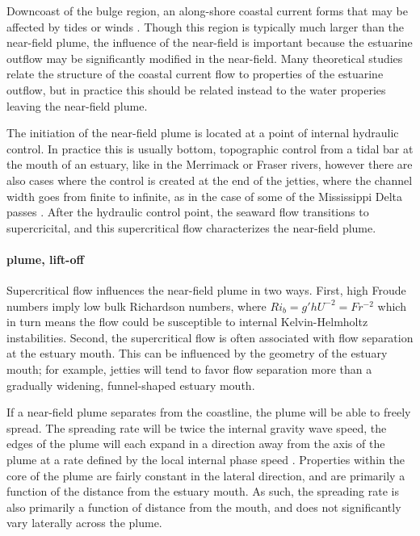 \documentclass[12pt]{article}
\begin{document}
{Downcoast of the bulge region, an along-shore coastal current forms \citep{} that may be affected by tides \citep{deboer.ea:08,pritchard.huntley:06} or winds \citep{fong.geyer:01,hetland:05,lentz:04,jurisa.chant:13}. Though this region is typically much larger than the near-field plume, the influence of the near-field is important because the estuarine outflow may be significantly modified in the near-field. Many theoretical studies relate the structure of the coastal current flow to properties of the estuarine outflow, but in practice this should be related instead to the water properies leaving the near-field plume.

The initiation of the near-field plume is located at a point of internal hydraulic control. In practice this is usually bottom, topographic control from a tidal bar at the mouth of an estuary, like in the Merrimack \citep{macdonald.ea:07} or Fraser \citep{macdonald.geyer:05} rivers, however there are also cases where the control is created at the end of the jetties, where the channel width goes from finite to infinite, as in the case of some of the Mississippi Delta passes \citep{wright.coleman:71}. After the hydraulic control point, the seaward flow transitions to supercricital, and this supercritical flow characterizes the near-field plume. \paragraph{plume, lift-off}

Supercritical flow influences the near-field plume in two ways. First, high Froude numbers imply low bulk Richardson numbers, where $Ri_b = g' h U^{-2} = Fr^{-2}$ which in turn means the flow could be susceptible to internal Kelvin-Helmholtz instabilities. Second, the supercritical flow is often associated with flow separation at the estuary mouth. This can be influenced by the geometry of the estuary mouth; for example, jetties will tend to favor flow separation more than a gradually widening, funnel-shaped estuary mouth.



If a near-field plume separates from the coastline, the plume will be able to freely spread. The spreading rate will be twice the internal gravity wave speed, the edges of the plume will each expand in a direction away from the axis of the plume at a rate defined by the local internal phase speed \citep{hetland.macdonald:08}. Properties within the core of the plume are fairly constant in the lateral direction, and are primarily a function of the distance from the estuary mouth. As such, the spreading rate is also primarily a function of distance from the mouth, and does not significantly vary laterally across the plume. 

}
\end{document}
